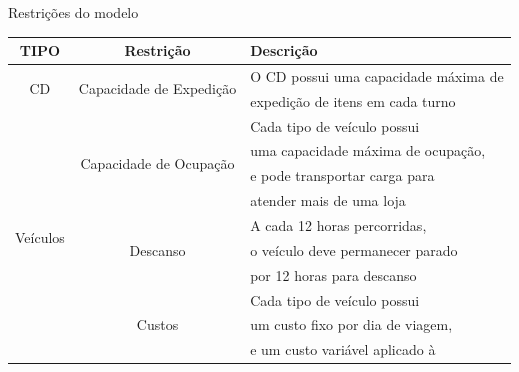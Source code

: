 \documentclass[12pt, a4paper]{article}
\begin{document}
                        
            \begin{quadro}[H]
                \caption{Restrições do modelo}
                \centering
                \begin{tabular}{|c|c|l|}
                    \hline
                    TIPO                        & Restrição                                     & Descrição                             \\ \hline
                    \multirow{2}{*}{CD}         & \multirow{2}{*}{Capacidade de Expedição}      & O CD possui uma capacidade máxima de  \\
                                                &                                               & expedição de itens em cada turno      \\ 
                    \hline
                    \multirow{17}{*}{Veículos}  & \multirow{4}{*}{Capacidade de Ocupação}       & Cada tipo de veículo possui           \\
                                                &                                               & uma capacidade máxima de ocupação,    \\
                                                &                                               & e pode transportar carga para         \\
                                                &                                               & atender mais de uma loja              \\   \cline{2-3}
                                                & \multirow{3}{*}{Descanso}                     & A cada 12 horas percorridas,          \\
                                                &                                               & o veículo deve permanecer parado      \\
                                                &                                               & por 12 horas para descanso            \\   \cline{2-3}
                                                & \multirow{4}{*}{Custos}                       & Cada tipo de veículo possui           \\
                                                &                                               & um custo fixo por dia de viagem,      \\
                                                &                                               & e um custo variável aplicado à        \\

\end{tabular}
\end{quadro}
\end{document}
